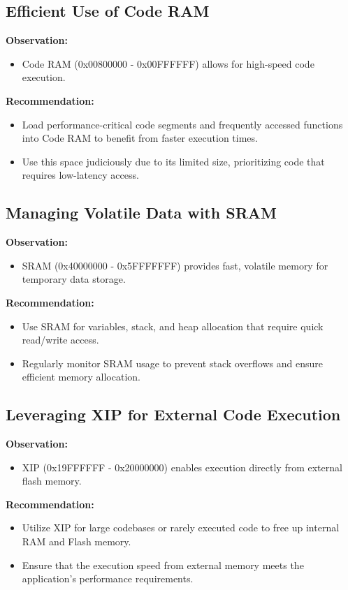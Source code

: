 \documentclass{Configuration_Files/PoliMi3i_thesis}
\begin{document}
\subsection{Efficient Use of Code RAM}
\textbf{Observation:}
\begin{itemize}
    \item Code RAM (0x00800000 - 0x00FFFFFF) allows for high-speed code execution.
\end{itemize}

\textbf{Recommendation:}
\begin{itemize}
    \item Load performance-critical code segments and frequently accessed functions into Code RAM to benefit from faster execution times.
    \item Use this space judiciously due to its limited size, prioritizing code that requires low-latency access.
\end{itemize}

\subsection{Managing Volatile Data with SRAM}
\textbf{Observation:}
\begin{itemize}
    \item SRAM (0x40000000 - 0x5FFFFFFF) provides fast, volatile memory for temporary data storage.
\end{itemize}

\textbf{Recommendation:}
\begin{itemize}
    \item Use SRAM for variables, stack, and heap allocation that require quick read/write access.
    \item Regularly monitor SRAM usage to prevent stack overflows and ensure efficient memory allocation.
\end{itemize}

\subsection{Leveraging XIP for External Code Execution}
\textbf{Observation:}
\begin{itemize}
    \item XIP (0x19FFFFFF - 0x20000000) enables execution directly from external flash memory.
\end{itemize}

\textbf{Recommendation:}
\begin{itemize}
    \item Utilize XIP for large codebases or rarely executed code to free up internal RAM and Flash memory.
    \item Ensure that the execution speed from external memory meets the application's performance requirements.
\end{itemize}
\end{document}
